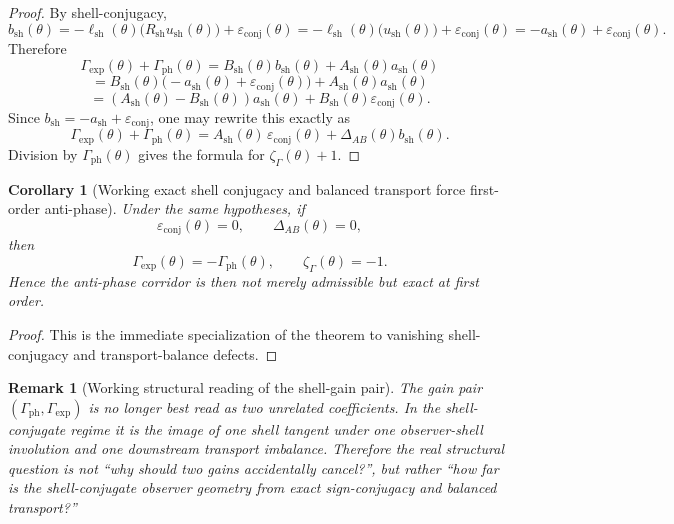 \documentclass[12pt,a4paper]{article}
\newtheorem{corollary}[theorem]{Corollary}
\newtheorem{remark}[theorem]{Remark}
\begin{document}
\begin{proof}
By shell-conjugacy,
\[
 b_{\mathrm{sh}}(\theta)
 =-\ell_{\mathrm{sh}}(\theta)\bigl(R_{\mathrm{sh}}u_{\mathrm{sh}}(\theta)\bigr)+\varepsilon_{\mathrm{conj}}(\theta)
 =-\ell_{\mathrm{sh}}(\theta)\bigl(u_{\mathrm{sh}}(\theta)\bigr)+\varepsilon_{\mathrm{conj}}(\theta)
 =-a_{\mathrm{sh}}(\theta)+\varepsilon_{\mathrm{conj}}(\theta).
\]
Therefore
\[
 \Gamma_{\mathrm{exp}}(\theta)+\Gamma_{\mathrm{ph}}(\theta)
 =B_{\mathrm{sh}}(\theta)b_{\mathrm{sh}}(\theta)+A_{\mathrm{sh}}(\theta)a_{\mathrm{sh}}(\theta)
\]
\[
 =B_{\mathrm{sh}}(\theta)\bigl(-a_{\mathrm{sh}}(\theta)+\varepsilon_{\mathrm{conj}}(\theta)\bigr)+A_{\mathrm{sh}}(\theta)a_{\mathrm{sh}}(\theta)
\]
\[
 =(A_{\mathrm{sh}}(\theta)-B_{\mathrm{sh}}(\theta))a_{\mathrm{sh}}(\theta)+B_{\mathrm{sh}}(\theta)\varepsilon_{\mathrm{conj}}(\theta).
\]
Since $b_{\mathrm{sh}}=-a_{\mathrm{sh}}+\varepsilon_{\mathrm{conj}}$, one may rewrite this exactly as
\[
 \Gamma_{\mathrm{exp}}(\theta)+\Gamma_{\mathrm{ph}}(\theta)
 =A_{\mathrm{sh}}(\theta)\,\varepsilon_{\mathrm{conj}}(\theta)+\Delta_{AB}(\theta)b_{\mathrm{sh}}(\theta).
\]
Division by $\Gamma_{\mathrm{ph}}(\theta)$ gives the formula for $\zeta_{\Gamma}(\theta)+1$.
\end{proof}

\begin{corollary}[Working exact shell conjugacy and balanced transport force first-order anti-phase]
Under the same hypotheses, if
\[
 \varepsilon_{\mathrm{conj}}(\theta)=0,
 \qquad
 \Delta_{AB}(\theta)=0,
\]
then
\[
 \Gamma_{\mathrm{exp}}(\theta)=-\Gamma_{\mathrm{ph}}(\theta),
 \qquad
 \zeta_{\Gamma}(\theta)=-1.
\]
Hence the anti-phase corridor is then not merely admissible but exact at first order.
\end{corollary}

\begin{proof}
This is the immediate specialization of the theorem to vanishing shell-conjugacy and transport-balance defects.
\end{proof}

\begin{remark}[Working structural reading of the shell-gain pair]
The gain pair $(\Gamma_{\mathrm{ph}},\Gamma_{\mathrm{exp}})$ is no longer best read as two unrelated coefficients. In the shell-conjugate regime it is the image of one shell tangent under one observer-shell involution and one downstream transport imbalance. Therefore the real structural question is not ``why should two gains accidentally cancel?'', but rather ``how far is the shell-conjugate observer geometry from exact sign-conjugacy and balanced transport?''
\end{remark}
\end{document}
